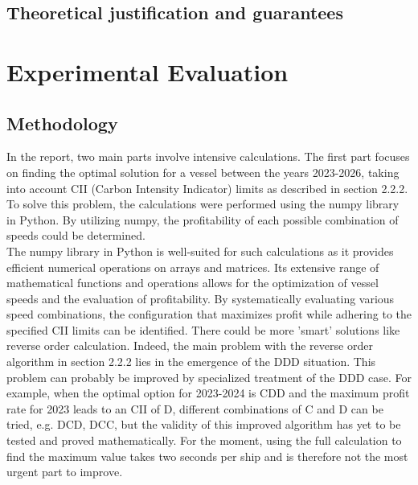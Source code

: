 \documentclass[a4paper,12pt]{article}
\begin{document}
\subsection{Theoretical justification and guarantees}

\section{Experimental Evaluation}
\subsection{Methodology}

In the report, two main parts involve intensive calculations. The first part focuses on finding the optimal solution for a vessel between the years 2023-2026, taking into account CII (Carbon Intensity Indicator) limits as described in section 2.2.2. To solve this problem, the calculations were performed using the numpy library in Python. By utilizing numpy, the profitability of each possible combination of speeds could be determined.\\

The numpy library in Python is well-suited for such calculations as it provides efficient numerical operations on arrays and matrices. Its extensive range of mathematical functions and operations allows for the optimization of vessel speeds and the evaluation of profitability. By systematically evaluating various speed combinations, the configuration that maximizes profit while adhering to the specified CII limits can be identified. There could be more 'smart' solutions like reverse order calculation. Indeed, the main problem with the reverse order algorithm in section 2.2.2 lies in the emergence of the DDD situation. This problem can probably be improved by specialized treatment of the DDD case. For example, when the optimal option for 2023-2024 is CDD and the maximum profit rate for 2023 leads to an CII of D, different combinations of C and D can be tried, e.g. DCD, DCC, but the validity of this improved algorithm has yet to be tested and proved mathematically. For the moment, using the full calculation to find the maximum value takes two seconds per ship and is therefore not the most urgent part to improve.\\
\end{document}
